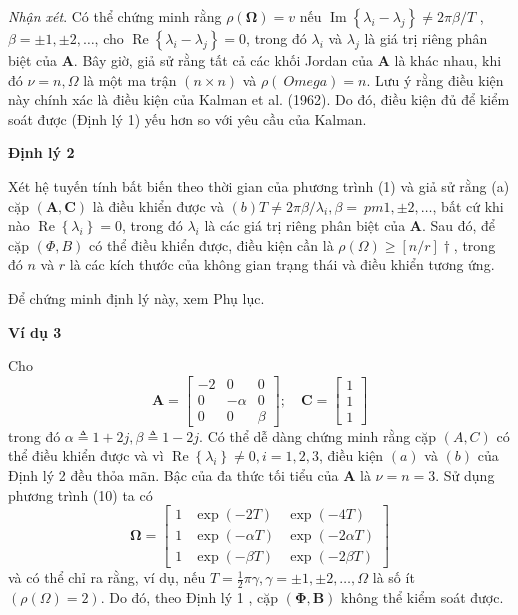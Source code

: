\documentclass[12pt,a4paper]{article}
\begin{document}
\textit{Nhận xét}. Có thể chứng minh rằng $\rho(\boldsymbol{\Omega})=v$ nếu $\operatorname{Im}\left\{\lambda_i-\lambda_j\right\} \neq 2 \pi \beta / T$ , $\beta= \pm 1, \pm 2, \ldots$, cho $\operatorname{Re}\left\{\lambda_i-\lambda_j\right\}=0$, trong đó $\lambda_i$ và $\lambda_j $ là giá trị riêng phân biệt của $\boldsymbol{A}$.
Bây giờ, giả sử rằng tất cả các khối Jordan của $\mathbf{A}$ là khác nhau, khi đó $\nu=n, \Omega$ là một ma trận $(n \times n)$ và $\rho(\ Omega)=n$. Lưu ý rằng điều kiện này chính xác là điều kiện của Kalman et al. (1962). Do đó, điều kiện đủ để kiểm soát được (Định lý 1) yếu hơn so với yêu cầu của Kalman.

\textbf{Định lý 2}

Xét hệ tuyến tính bất biến theo thời gian của phương trình (1) và giả sử rằng (a) cặp $(\mathbf{A}, \mathbf{C})$ là điều khiển được và $(b) T \neq 2 \pi \beta / \lambda_i, \beta= \ pm 1, \pm 2, \ldots$, bất cứ khi nào $\operatorname{Re}\left\{\lambda_i\right\}=0$, trong đó $\lambda_i$ là các giá trị riêng phân biệt của $\mathbf{A }$. Sau đó, để cặp $(\Phi, B)$ có thể điều khiển được, điều kiện cần là $\rho(\Omega) \geqslant[n / r] \dagger$, trong đó $n$ và $r$ là các kích thước của không gian trạng thái và điều khiển tương ứng.

Để chứng minh định lý này, xem Phụ lục.

\textbf{Ví dụ 3}

Cho
$$
\mathbf{A}=\left[\begin{array}{rrr}
	-2 & 0 & 0 \\
	0 & -\alpha & 0 \\
	0 & 0 & \beta
\end{array}\right] ; \quad \mathbf{C}=\left[\begin{array}{l}
	1 \\
	1 \\
	1
\end{array}\right]
$$
trong đó $\alpha \triangleq 1+2 j, \beta \triangleq 1-2 j$. Có thể dễ dàng chứng minh rằng cặp $(A, C)$ có thể điều khiển được và vì $\operatorname{Re}\left\{\lambda_i\right\} \neq 0, i=1,2,3$, điều kiện $(a )$ và $(b)$ của Định lý 2 đều thỏa mãn. Bậc của đa thức tối tiểu của $\mathbf{A}$ là $\nu=n=3$. Sử dụng phương trình (10) ta có
$$
\boldsymbol{\Omega}=\left[\begin{array}{lll}
	1 & \exp (-2 T) & \exp (-4 T) \\
	1 & \exp (-\alpha T) & \exp (-2 \alpha T) \\
	1 & \exp (-\beta T) & \exp (-2 \beta T)
\end{array}\right]
$$
và có thể chỉ ra rằng, ví dụ, nếu $T=\frac{1}{2} \pi \gamma, \gamma= \pm 1, \pm 2, \ldots, \Omega$ là số ít $(\rho (\Omega)=2)$. Do đó, theo Định lý 1 , cặp $(\boldsymbol{\Phi}, \mathbf{B})$ không thể kiểm soát được. 
\end{document}
